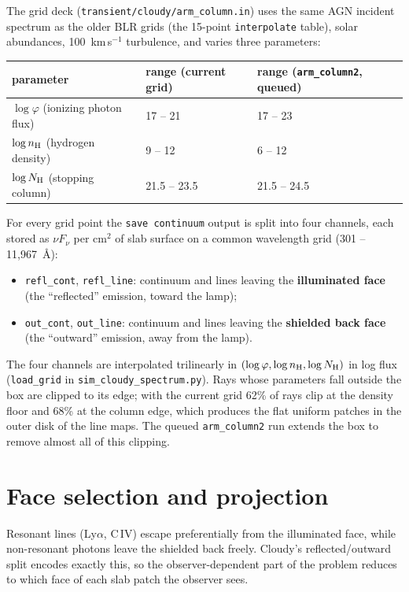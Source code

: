 \documentclass[11pt]{article}
\newcommand{\nH}{n_{\rm H}}
\begin{document}
The grid deck (\texttt{transient/cloudy/arm\_column.in}) uses the same
AGN incident spectrum as the older BLR grids (the 15-point
\texttt{interpolate} table), solar abundances, 100~km\,s$^{-1}$
turbulence, and varies three parameters:
\begin{center}
\begin{tabular}{lll}
\toprule
parameter & range (current grid) & range (\texttt{arm\_column2}, queued)\\
\midrule
$\log \varphi$ (ionizing photon flux) & 17 -- 21 & 17 -- 23\\
$\log \nH$ (hydrogen density)         & 9 -- 12  & 6 -- 12\\
$\log N_{\rm H}$ (stopping column)    & 21.5 -- 23.5 & 21.5 -- 24.5\\
\bottomrule
\end{tabular}
\end{center}
For every grid point the \texttt{save continuum} output is split into
four channels, each stored as $\nu F_\nu$ per cm$^2$ of slab surface
on a common wavelength grid (301 -- 11{,}967~\AA):
\begin{itemize}
\item \texttt{refl\_cont}, \texttt{refl\_line}: continuum and lines
      leaving the \textbf{illuminated face} (the ``reflected''
      emission, toward the lamp);
\item \texttt{out\_cont}, \texttt{out\_line}: continuum and lines
      leaving the \textbf{shielded back face} (the ``outward''
      emission, away from the lamp).
\end{itemize}
The four channels are interpolated trilinearly in
$(\log\varphi, \log\nH, \log N_{\rm H})$ in log flux
(\texttt{load\_grid} in \texttt{sim\_cloudy\_spectrum.py}). Rays whose
parameters fall outside the box are clipped to its edge; with the
current grid 62\% of rays clip at the density floor and 68\% at the
column edge, which produces the flat uniform patches in the outer disk
of the line maps. The queued \texttt{arm\_column2} run extends the box
to remove almost all of this clipping.

\section{Face selection and projection}

Resonant lines (Ly$\alpha$, C\,IV) escape preferentially from the
illuminated face, while non-resonant photons leave the shielded back
freely. Cloudy's reflected/outward split encodes exactly this, so the
observer-dependent part of the problem reduces to which face of each
slab patch the observer sees.
\end{document}
